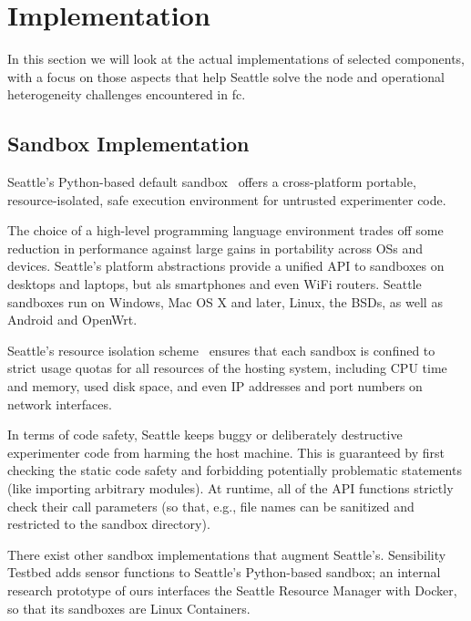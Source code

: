 \section{Implementation}

In this section we will look at the actual implementations of
selected components, with a focus on those aspects that help
Seattle solve the node and operational heterogeneity
challenges encountered in \gls{fc}.

\subsection{Sandbox Implementation}

Seattle's Python-based default sandbox~\cite{RepySandbox}
offers a cross-platform portable, resource-isolated,
safe execution environment for untrusted experimenter code.

The choice of a high-level programming language environment trades
off some reduction in performance against large gains in portability
across \glspl{OS} and devices. Seattle's platform abstractions
provide a unified \gls{API} to sandboxes on desktops and laptops,
but als smartphones and even WiFi routers. Seattle sandboxes
run on Windows, Mac OS X and later, Linux, the \glspl{BSD}, as
well as Android and OpenWrt.

Seattle's resource isolation scheme~\cite{li2015fence} ensures
that each sandbox is confined to strict usage quotas for all
resources of the hosting system, including \gls{CPU} time and
memory, used disk space, and even \gls{IP} addresses and port numbers
on network interfaces.

In terms of code safety, Seattle keeps buggy or deliberately destructive
experimenter code from harming the host machine. This is guaranteed
by first checking the static code safety and forbidding potentially
problematic statements (like importing arbitrary modules). At runtime,
all of the \gls{API} functions strictly check their call parameters
(so that, e.g., file names can be sanitized and restricted to the
sandbox directory).

There exist other sandbox implementations that augment Seattle's.
Sensibility Testbed adds sensor functions to Seattle's Python-based
sandbox; an internal research prototype of ours interfaces the
Seattle Resource Manager with Docker, so that its sandboxes are
Linux Containers.




